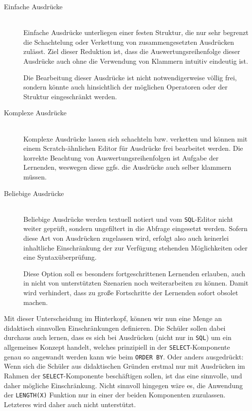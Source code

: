 \begin{description}
\item[Einfache Ausdrücke] \hfill\\
  Einfache Ausdrücke unterliegen einer festen Struktur, die nur sehr begrenzt die Schachtelung oder Verkettung von zusammengesetzten Ausdrücken zulässt. Ziel dieser Reduktion ist, dass die Auswertungsreihenfolge dieser Ausdrücke auch ohne die Verwendung von Klammern intuitiv eindeutig ist.

  Die Bearbeitung dieser Ausdrücke ist nicht notwendigerweise völlig frei, sondern könnte auch hinsichtlich der möglichen Operatoren oder der Struktur eingeschränkt werden.
\item[Komplexe Ausdrücke] \hfill\\
  Komplexe Ausdrücke lassen sich schachteln bzw. verketten und können mit einem Scratch-ähnlichen Editor für Ausdrücke frei bearbeitet werden. Die korrekte Beachtung von Auswertungsreihenfolgen ist Aufgabe der Lernenden, weswegen diese ggfs. die Ausdrücke auch selber klammern müssen.

\item[Beliebige Ausdrücke] \hfill\\
  Beliebige Ausdrücke werden textuell notiert und vom \texttt{SQL}-Editor nicht weiter geprüft, sondern ungefiltert in die Abfrage eingesetzt werden. Sofern diese Art von Ausdrücken zugelassen wird, erfolgt also auch keinerlei inhaltliche Einschränkung der zur Verfügung stehenden Möglichkeiten oder eine Syntaxüberprüfung.

  Diese Option soll es besonders fortgeschrittenen Lernenden erlauben, auch in nicht von \idename{} unterstützten Szenarien noch weiterarbeiten zu können. Damit wird verhindert, dass zu große Fortschritte der Lernenden \idename{} sofort obsolet machen.
\end{description}

Mit dieser Unterscheidung im Hinterkopf, können wir nun eine Menge an didaktisch sinnvollen Einschränkungen definieren. Die Schüler sollen dabei durchaus auch lernen, dass es sich bei Ausdrücken (nicht nur in \texttt{SQL}) um ein allgemeines Konzept handelt, welches prinzipiell in der \texttt{SELECT}-Komponente genau so angewandt werden kann wie beim \texttt{ORDER BY}. Oder anders ausgedrückt: Wenn sich die Schüler aus didaktischen Gründen erstmal nur mit Ausdrücken im Rahmen der \texttt{SELECT}-Komponente beschäftigen sollen, ist das eine sinnvolle, und daher mögliche Einschränkung. Nicht sinnvoll hingegen wäre es, die Anwendung der \texttt{LENGTH(X)} Funktion nur in einer der beiden Komponenten zuzulassen. Letzteres wird daher auch nicht unterstützt.

